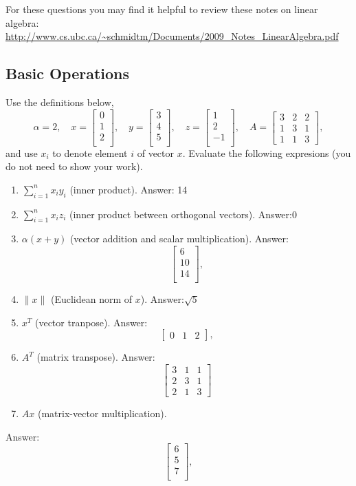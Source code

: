 \documentclass{article}
\def\blu#1{{\color{blu}#1}}
\def\norm#1{\|#1\|}
\def\enum#1{\begin{enumerate}#1\end{enumerate}}
\begin{document}
For these questions you may find it helpful to review these notes on linear algebra:\\
\url{http://www.cs.ubc.ca/~schmidtm/Documents/2009_Notes_LinearAlgebra.pdf}

\subsection{Basic Operations}

Use the definitions below,
\[
\alpha = 2,\quad
x = \left[\begin{array}{c}
0\\
1\\
2\\
\end{array}\right], \quad 
y = \left[\begin{array}{c}
3\\
4\\
5\\
\end{array}\right],\quad
z = \left[\begin{array}{c}
1\\
2\\
-1\\
\end{array}\right],\quad
A = \left[\begin{array}{ccc}
3 & 2 & 2\\
1 & 3 & 1\\
1 & 1 & 3
\end{array}\right],
\]
and use $x_i$ to denote element $i$ of vector $x$.
\blu{Evaluate the following expresions} (you do not need to show your work).
\enum{
\item $\sum_{i=1}^n x_iy_i$ (inner product). \blu {Answer:} 14
\item $\sum_{i=1}^n x_iz_i$ (inner product between orthogonal vectors). \blu {Answer:}0
\item $\alpha(x+y)$ (vector addition and scalar multiplication). \blu {Answer:}\[
 \left[\begin{array}{c}
6\\
10\\
14\\
\end{array}\right] ,
\]
\item $\norm{x}$ (Euclidean norm of $x$). \blu {Answer:}$\sqrt{5}$
\item $x^T$ (vector tranpose). \blu {Answer:} \[
\left[\begin{array}{ccc}
0 & 1 & 2
\end{array}\right] ,
\]
\item $A^T$ (matrix transpose).
 \blu {Answer:}\[
\left[\begin{array}{ccc}
3 & 1 & 1\\
2 & 3 & 1\\
2 & 1 & 3
\end{array}\right]
\]
\item $Ax$ (matrix-vector multiplication).
}
\blu {Answer:} \[
 \left[\begin{array}{c}
6\\
5\\
7\\
\end{array}\right] ,
\]
\end{document}
